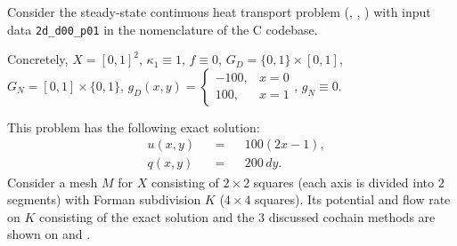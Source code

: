 \begin{example}
  \label{cmc/diffusion/continuous/steady_state/examples/2d_d00_p01-example}
  Consider the steady-state continuous heat transport problem
  (,
   ,
   )
  with input data \verb|2d_d00_p01| in the nomenclature of the C codebase.

  Concretely,
    $X = [0, 1]^2$,
    $\kappa_1 \equiv 1$,
    $f \equiv 0$,
    $G_D = \{0, 1\} \times [0, 1]$,
    $G_N = [0, 1] \times \{0, 1\}$,
    $g_D(x, y) = \begin{cases} -100, & x = 0 \\ 100, & x = 1 \end{cases}$,
    $g_N \equiv 0$.

  This problem has the following exact solution:
  \begin{subequations}
    \begin{alignat}{3}
      & u(x, y) && = && 100 (2 x - 1), \\
      & q(x, y) && = && 200\, d y.
    \end{alignat}
  \end{subequations}
  Consider a mesh $M$ for $X$ consisting of $2 \times 2$ squares (each axis is
  divided into $2$ segments) with Forman subdivision $K$ ($4 \times 4$ squares).
  Its potential and flow rate on $K$ consisting of the exact solution and the
  $3$ discussed cochain methods are shown on
  and
  .
\end{example}
